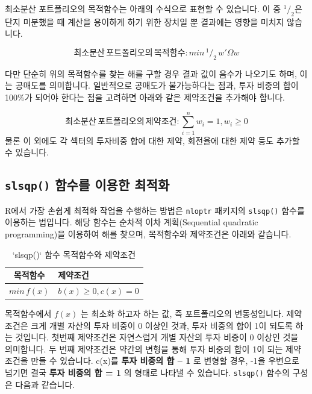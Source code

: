 \documentclass[12pt,]{book}
\begin{document}
최소분산 포트폴리오의 목적함수는 아래의 수식으로 표현할 수 있습니다. 이 중 \(^1/_2\)은 단지 미분했을 때 계산을 용이하게 하기 위한 장치일 뿐 결과에는 영향을 미치지 않습니다.

\[ 최소분산\,포트폴리오의\,목적함수: min\,^1/_2\,w'\Omega w \]

다만 단순히 위의 목적함수를 찾는 해를 구할 경우 결과 값이 음수가 나오기도 하며, 이는 공매도를 의미합니다. 일반적으로 공매도가 불가능하다는 점과, 투자 비중의 합이 100\%가 되어야 한다는 점을 고려하면 아래와 같은 제약조건을 추가해야 합니다.

\[ 최소분산\,포트폴리오의\,제약조건: \sum_{i=1}^{n}w_i = 1, w_i \ge 0 \]
물론 이 외에도 각 섹터의 투자비중 합에 대한 제약, 회전율에 대한 제약 등도 추가할 수 있습니다.

\hypertarget{slsqp---}{%
\subsection{\texorpdfstring{\texttt{slsqp()} 함수를 이용한 최적화}{slsqp() 함수를 이용한 최적화}}\label{slsqp---}}

R에서 가장 손쉽게 최적화 작업을 수행하는 방법은 \texttt{nloptr} 패키지의 \texttt{slsqp()} 함수를 이용하는 법입니다. 해당 함수는 순차적 이차 계획(Sequential quadratic programming)을 이용하여 해를 찾으며, 목적함수와 제약조건은 아래와 같습니다.

\begin{table}[!h]

\caption{\label{tab:unnamed-chunk-5}`slsqp()` 함수 목적함수와 제약조건}
\centering
\begin{tabular}{c>{\centering\arraybackslash}p{6cm}}
\toprule
목적함수 & 제약조건\\
\midrule
\rowcolor{gray!6}  $min\,f(x)$ & $b(x)\ge0, c(x)=0$\\
\bottomrule
\end{tabular}
\end{table}

목적함수에서 \(f(x)\) 는 최소화 하고자 하는 값, 즉 포트폴리오의 변동성입니다. 제약조건은 크게 개별 자산의 투자 비중이 0 이상인 것과, 투자 비중의 합이 1이 되도록 하는 것입니다. 첫번째 제약조건은 자연스럽게 개별 자산의 투자 비중이 0 이상인 것을 의미합니다. 두 번째 제약조건은 약간의 변형을 통해 투자 비중의 합이 1이 되는 제약조건을 만들 수 있습니다. c(x)를 \textbf{투자 비중의 합 -- 1} 로 변형할 경우, -1을 우변으로 넘기면 결국 \textbf{투자 비중의 합 = 1} 의 형태로 나타낼 수 있습니다. \texttt{slsqp()} 함수의 구성은 다음과 같습니다.
\end{document}
